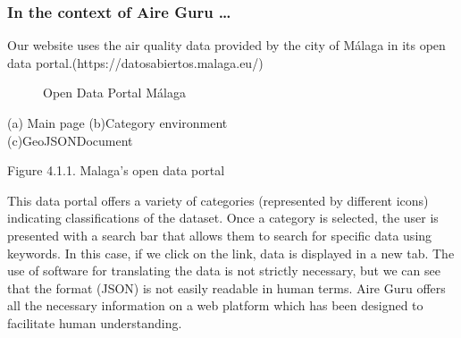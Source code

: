 \subsubsection*{In the context of Aire Guru \ldots} 

Our website uses the air quality data provided by the city of Málaga in its open data portal.(https://datosabiertos.malaga.eu/)\\

\begin{figure}[ht]
    \centering
    \hfill
    \vfill
    \caption{Open Data Portal Málaga}
\end{figure}


\begin{center}
    \bf{ (a) Main page     (b)Category environment\\
    (c)GeoJSONDocument
        
    Figure 4.1.1. Malaga's open data portal}
\end{center}

This data portal offers a variety of categories (represented by different icons) indicating classifications of the dataset.
Once a category is selected, the user is presented with a search bar that allows them to search for specific data using keywords.
In this case, if we click on the link, data is displayed in a new tab. The use of software
for translating the data is not strictly necessary, but we can see that the format (JSON) is not easily readable in human terms.
Aire Guru offers all the necessary information on a web platform which has been designed to facilitate human understanding. \\